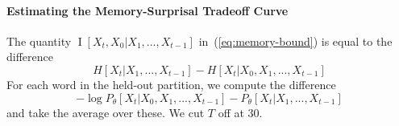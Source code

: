 \documentclass[11pt,letterpaper]{article}
\begin{document}



\paragraph{Estimating the Memory-Surprisal Tradeoff Curve}



The quantity $\operatorname{I}[X_t, X_0 | X_1, ..., X_{t-1}]$ in~(\ref{eq:memory-bound}) is equal to the difference 
\begin{equation}
H[X_t|X_1, ..., X_{t-1}] - H[X_t|X_0, X_1, ..., X_{t-1}]
\end{equation}
For each word in the held-out partition, we compute the difference
\begin{equation}
	-\log P_\theta[X_t | X_0, X_1, ..., X_{t-1}] - P_\theta[X_t | X_1, ..., X_{t-1}]
\end{equation}
and take the average over these.
We cut $T$ off at 30.


%
%
%
%
\end{document}
